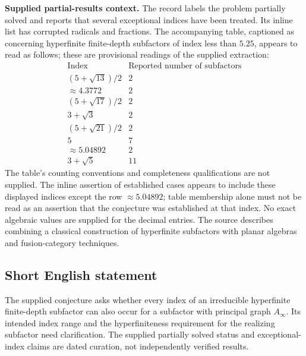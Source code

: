 \documentclass[11pt]{article}
\begin{document}
\textbf{Supplied partial-results context.} The record labels the problem partially solved and reports that several exceptional indices have been treated. Its inline list has corrupted radicals and fractions. The accompanying table, captioned as concerning hyperfinite finite-depth subfactors of index less than \(5.25\), appears to read as follows; these are provisional readings of the supplied extraction:
\[
\begin{array}{c|c}
\text{Index}&\text{Reported number of subfactors}\\\hline
(5+\sqrt{13})/2&2\\
\approx 4.3772&2\\
(5+\sqrt{17})/2&2\\
3+\sqrt{3}&2\\
(5+\sqrt{21})/2&2\\
5&7\\
\approx 5.04892&2\\
3+\sqrt{5}&11
\end{array}
\]
The table's counting conventions and completeness qualifications are not supplied. The inline assertion of established cases appears to include these displayed indices except the row \(\approx5.04892\); table membership alone must not be read as an assertion that the conjecture was established at that index. No exact algebraic values are supplied for the decimal entries. The source describes combining a classical construction of hyperfinite subfactors with planar algebras and fusion-category techniques.
\subsection{Short English statement}
The supplied conjecture asks whether every index of an irreducible hyperfinite finite-depth subfactor can also occur for a subfactor with principal graph \(A_\infty\). Its intended index range and the hyperfiniteness requirement for the realizing subfactor need clarification. The supplied partially solved status and exceptional-index claims are dated curation, not independently verified results.
\end{document}
